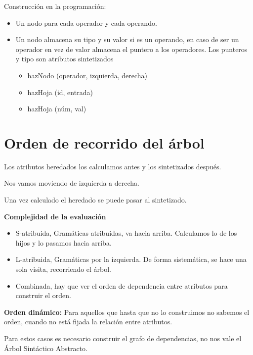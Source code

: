 \documentclass[12pt, twoside, openright]{report} %
\begin{document}
Construcción en la programación:
\begin{itemize}
  \item Un nodo para cada operador y cada operando.
  \item Un nodo almacena su tipo y su valor si es un operando, en caso de ser un operador en vez de valor almacena el puntero a los operadores. Los punteros y tipo son atributos sintetizados
  \begin{itemize}
    \item hazNodo (operador, izquierda, derecha)
    \item hazHoja (id, entrada)
    \item hazHoja (núm, val)
  \end{itemize}
\end{itemize}

\section{Orden de recorrido del árbol}

Los atributos heredados los calculamos antes y los sintetizados después. 

Nos vamos moviendo de izquierda a derecha.

Una vez calculado el heredado se puede pasar al sintetizado.

\textbf{Complejidad de la evaluación}
\begin{figure}[H]
	{\def\svgwidth{.7\textwidth}
  }
\end{figure}
\begin{itemize}
  \item S-atribuida, Gramáticas atribuidas, va hacia arriba. Calculamos lo de los hijos y lo pasamos hacia arriba.
  \item L-atribuida, Gramáticas por la izquierda. De forma sistemática, se hace una sola visita, recorriendo el árbol.
  \item Combinada, hay que ver el orden de dependencia entre atributos para construir el orden.
\end{itemize}

\textbf{Orden dinámico:} Para aquellos que hasta que no lo construimos no sabemos el orden, cuando no está fijada la relación entre atributos.
  
Para estos casos es necesario construir el grafo de dependencias, no nos vale el Árbol Sintáctico Abstracto.
\end{document}
